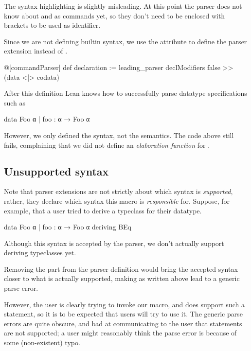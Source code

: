 \begin{remark}
    The syntax highlighting is slightly misleading. At this point the parser does not know about \data{} and \codata{} as commands yet, so they don't need to be enclosed with  brackets to be used as identifier.
\end{remark}

Since we are not defining builtin syntax, we use the  attribute to define the parser extension
instead of .

\begin{leancode}
  @[commandParser] def declaration := leading_parser 
      declModifiers false >> (data <|> codata)
\end{leancode}


After this definition Lean knows how to successfully parse datatype specifications such as
\begin{badleancode}
  data Foo α
    | foo : α → Foo α
\end{badleancode}

However, we only defined the syntax, not the semantics. 
The code above still fails, complaining that we did not define an \emph{elaboration function} for .


\subsection*{Unsupported syntax}%
\label{subsec:impl:unsupported_syntax}

Note that parser extensions are not strictly about which syntax is \emph{supported}, rather, they declare which syntax this macro is \emph{responsible} for.
Suppose, for example, that a user tried to derive a typeclass for their datatype.
\begin{badleancode}
  data Foo α
    | foo : α → Foo α
    deriving BEq
\end{badleancode}

Although this syntax is accepted by the \data{} parser, we don't actually support deriving typeclasses yet.

Removing the  part from the parser definition would bring the accepted syntax closer to what is actually supported, making  as written above lead to a generic parse error.

However, the user is clearly trying to invoke our \data{} macro, and \inductive{} does support such a  statement, so it is to be expected that users will try to use it. The generic parse errors are quite obscure, and bad at communicating to the user that  statements are not supported; a user might reasonably think the parse error is because of some (non-existent) typo.

